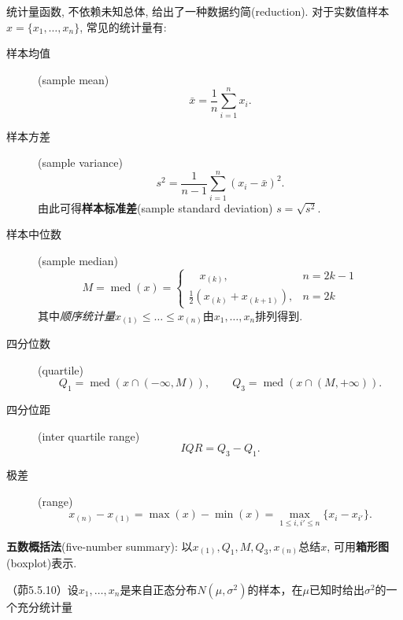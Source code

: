 统计量函数, 不依赖未知总体, 给出了一种数据约简(reduction). 对于实数值样本$x = \{x_{1},\dots,x_{n}\}$, 常见的统计量有: \label{descriptive-statistics}
\begin{description}
      \item [样本均值](sample mean)
            \[ \bar{x} = \frac{1}{n}\sum_{i=1}^{n}x_{i}. \]
      \item [样本方差](sample variance)
            \[ s^{2} = \frac{1}{n-1}\sum_{i=1}^{n}(x_{i}-\bar{x})^{2}. \]
            由此可得\textbf{样本标准差}(sample standard deviation) $s = \sqrt{s^2}$.
      \item [样本中位数](sample median)
            \[ M = \operatorname{med}(x) = \begin{cases}
                        \quad x_{(k)},                  & n = 2k-1 \\
                        \frac{1}{2}(x_{(k)}+x_{(k+1)}), & n = 2k
                  \end{cases} \]
            其中\emph{顺序统计量}$x_{(1)}\leq\dots\leq x_{(n)}$由$x_{1},\dots,x_{n}$排列得到.
      \item [四分位数](quartile)
            \[ Q_{1} = \operatorname{med}(x\cap(-\infty,M)), \qquad
                  Q_{3} = \operatorname{med}(x\cap(M,+\infty)). \]
      \item [四分位距](inter quartile range)
            \[ \mathit{IQR} = Q_{3} - Q_{1}. \]
      \item [极差](range)
            \[ x_{(n)}-x_{(1)} = \max(x)-\min(x) = \max_{1\leq i,i' \leq n}\{x_{i}-x_{i'}\}. \]
\end{description}

\begin{definition}
      \textbf{五数概括法}(five-number summary): 以$x_{(1)},Q_{1},M,Q_{3},x_{(n)}$总结$x$, 可用\textbf{箱形图}(boxplot)表示.
\end{definition}

\begin{problemset}[错题记录]
      \item （茆5.5.10）设$x_1,\dotsc,x_n$是来自正态分布$N(\mu,\sigma^2)$的样本，在$\mu$已知时给出$\sigma^2$的一个充分统计量
  \end{problemset}
